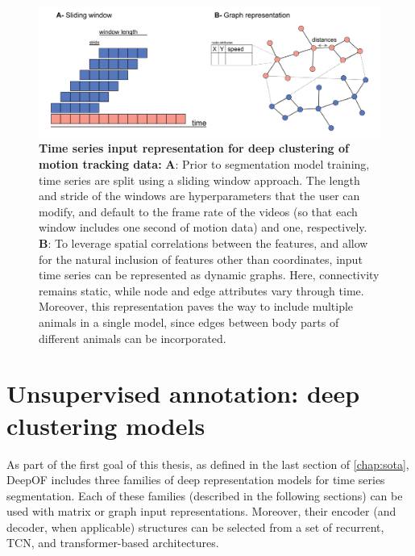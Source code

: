 \begin{figure}[!thb]
\centering
\includegraphics[width=\textwidth]{Figures/methods_1.pdf}

\caption[\textbf{Time series input representation for deep clustering of motion tracking data}]{\textbf{Time series input representation for deep clustering of motion tracking data:} \textbf{A}: Prior to segmentation model training, time series are split using a sliding window approach. The length and stride of the windows are hyperparameters that the user can modify, and default to the frame rate of the videos (so that each window includes one second of motion data) and one, respectively. \textbf{B}: To leverage spatial correlations between the features, and allow for the natural inclusion of features other than coordinates, input time series can be represented as dynamic graphs. Here, connectivity remains static, while node and edge attributes vary through time. Moreover, this representation paves the way to include multiple animals in a single model, since edges between body parts of different animals can be incorporated.}
\label{fig:3.1}

\end{figure}

\section{Unsupervised annotation: deep clustering models}

As part of the first goal of this thesis, as defined in the last section of \cref{chap:sota}, DeepOF includes three families of deep representation models for time series segmentation. Each of these families (described in the following sections) can be used with matrix or graph input representations. Moreover, their encoder (and decoder, when applicable) structures can be selected from a set of recurrent, TCN, and transformer-based architectures. 

